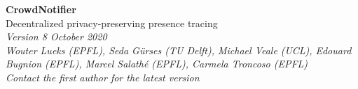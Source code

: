 \documentclass[a4paper,11pt]{article}
\begin{document}
\begin{center}
  \color{cnblue}
  \fontsize{18pt}{27pt}\selectfont
  {\bf\textsf{CrowdNotifier}}\\
  \fontsize{15pt}{22pt}\selectfont
  Decentralized privacy-preserving presence tracing\\
  \fontsize{11pt}{18pt}\selectfont
  \textit{Version 8 October 2020}\\[11pt]
  \fontsize{12pt}{18pt}\selectfont
  \textit{Wouter Lueks (EPFL), Seda Gürses (TU Delft), Michael Veale
    (UCL), Edouard Bugnion (EPFL), Marcel Salathé (EPFL), Carmela Troncoso
    (EPFL)}\\[11pt]
  \fontsize{11pt}{15pt}\selectfont
  \textit{Contact the first author for the latest version}\\[12pt]
\end{center}

\thispagestyle{plain}
\pagestyle{plain}








\end{document}
